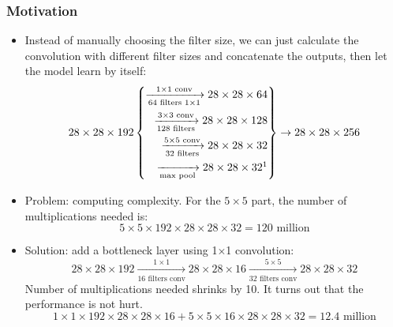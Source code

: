 \subsubsection{Motivation}
\begin{itemize}
  \item Instead of manually choosing the filter size, we can just calculate the convolution with different filter sizes and concatenate the outputs, then let the model learn by itself:
  \begin{align*}
    28\times 28\times 192\left\{
      \begin{aligned}
        \xrightarrow[64\text{ filters 1$\times$1}]{1\times 1\text{ conv}}28\times 28\times 64\\
        \xrightarrow[128\text{ filters}]{3\times 3\text{ conv}}28\times 28\times 128\\
        \xrightarrow[32\text{ filters}]{5\times 5\text{ conv}}28\times 28\times 32\\
        \xrightarrow[\text{max pool}]{}28\times 28\times 32\footnotemark
      \end{aligned}
    \right\}\rightarrow
    28\times 28\times 256
  \end{align*}
  \item Problem: computing complexity. For the $5\times 5$ part, the number of multiplications needed is:
  \[5\times 5\times 192\times 28\times 28\times 32=120\text{ million}\]
  \item Solution: add a bottleneck layer using 1$\times$1 convolution:
  \[28\times 28\times 192\xrightarrow[16\text{ filters conv}]{1\times 1}28\times 28\times 16
  \xrightarrow[32\text{ filters conv}]{5\times 5}28\times 28\times 32\]
  Number of multiplications needed shrinks by 10. It turns out that the performance is not hurt.
  \[1\times 1\times 192\times 28\times 28\times 16+5\times 5\times 16\times 28\times 28\times 32=12.4\text{ million}\]
\end{itemize}
